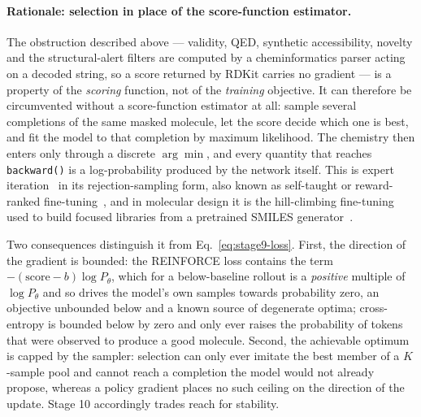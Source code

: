 \paragraph{Rationale: selection in place of the score-function estimator.}
The obstruction described above --- validity, QED, synthetic accessibility,
novelty and the structural-alert filters are computed by a cheminformatics
parser acting on a decoded string, so a score returned by RDKit carries no
gradient --- is a property of the \emph{scoring} function, not of the
\emph{training} objective. It can therefore be circumvented without a
score-function estimator at all: sample several completions of the same masked
molecule, let the score decide which one is best, and fit the model to that
completion by maximum likelihood. The chemistry then enters only through a
discrete $\arg\min$, and every quantity that reaches \texttt{backward()} is a
log-probability produced by the network itself. This is expert
iteration~\cite{anthony2017expert} in its rejection-sampling form, also known as
self-taught or reward-ranked fine-tuning~\cite{zelikman2022star,dong2023raft},
and in molecular design it is the hill-climbing fine-tuning used to build
focused libraries from a pretrained SMILES
generator~\cite{segler2018focused,brown2019guacamol}.

Two consequences distinguish it from Eq.~\eqref{eq:stage9-loss}. First, the
direction of the gradient is bounded: the REINFORCE loss contains the term
$-(\mathrm{score}-b)\log P_{\theta}$, which for a below-baseline rollout is a
\emph{positive} multiple of $\log P_{\theta}$ and so drives the model's own
samples towards probability zero, an objective unbounded below and a known
source of degenerate optima; cross-entropy is bounded below by zero and only
ever raises the probability of tokens that were observed to produce a good
molecule. Second, the achievable optimum is capped by the sampler: selection
can only ever imitate the best member of a $K$-sample pool and cannot reach a
completion the model would not already propose, whereas a policy gradient
places no such ceiling on the direction of the update. Stage 10 accordingly
trades reach for stability.

